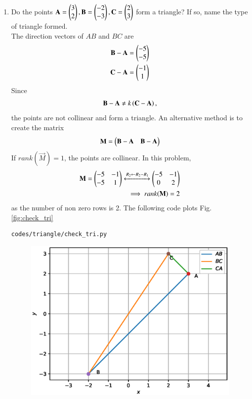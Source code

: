 \renewcommand{\theequation}{\theenumi}
\begin{enumerate}[label=\arabic*.,ref=\thesubsection.\theenumi]
%
\item Do the points $\mathbf{A}=\begin{pmatrix}3\\2\end{pmatrix}, \mathbf{B}=\begin{pmatrix}-2\\-3\end{pmatrix}, \mathbf{C}=\begin{pmatrix}2\\3\end{pmatrix} $ form a triangle?  If so, name the type of triangle formed.
%
\\
\solution The direction vectors of $AB$ and $BC$ are 
\begin{align}
\label{eq:tri_geo_ex_baorth}
\mathbf{B}-\mathbf{A} &= \begin{pmatrix}-5\\-5\end{pmatrix}
\\
\mathbf{C}-\mathbf{A} &= \begin{pmatrix}-1\\1\end{pmatrix}
\label{eq:tri_geo_ex_caorth}
\end{align}
%
Since 
%
\begin{align}
\mathbf{B}-\mathbf{A} \ne k\left(\mathbf{C}-\mathbf{A}\right),
\end{align}
%
the points are not collinear and form a triangle.  An alternative method is to create the matrix
\begin{align}
\label{eq:tri_geo_ex_diff_mat}
\mathbf{M} = \begin{pmatrix}\mathbf{B}-\mathbf{A} & \mathbf{B}-\mathbf{A}\end{pmatrix} 
\end{align}
%
If $rank(\vec{M}) = 1$, the points are collinear.  In this problem, 
%
\begin{align}
\mathbf{M} = \begin{pmatrix}-5 & -1\\-5 & 1\end{pmatrix}\xleftrightarrow {R_2\leftarrow R_2-R_1}\begin{pmatrix}-5 & -1\\0 & 2\end{pmatrix}
\\
\implies rank(\mathbf{M}) = 2
\end{align}
%
as the number of non zero rows is 2.
The following code plots Fig. \ref{fig:check_tri}
%
\begin{lstlisting}
codes/triangle/check_tri.py
\end{lstlisting}
%
\begin{figure}[!ht]
\includegraphics[width=\columnwidth]{./triangle/figs/check_tri.eps}

\end{figure}
\end{enumerate}
